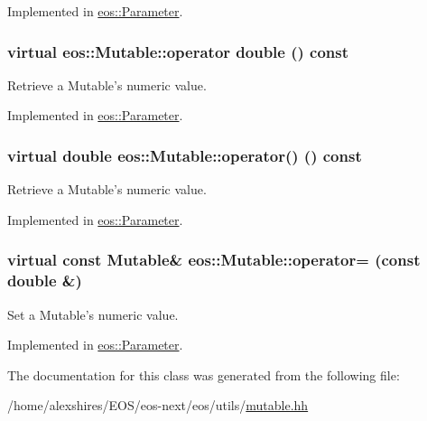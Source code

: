Implemented in \hyperlink{classeos_1_1Parameter_a86f581847722de0445ae65065940fd13}{eos::Parameter}.\hypertarget{classeos_1_1Mutable_a0763bf2933503db18d28b942aae2d324}{
\subsubsection[{operator double}]{\setlength{\rightskip}{0pt plus 5cm}virtual eos::Mutable::operator double () const}}
\label{classeos_1_1Mutable_a0763bf2933503db18d28b942aae2d324}


Retrieve a Mutable's numeric value. 

Implemented in \hyperlink{classeos_1_1Parameter_ad2dc69fe74e308328dc8a1d901c916ec}{eos::Parameter}.\hypertarget{classeos_1_1Mutable_a6efd15ab0164a1735813669506e331d7}{
\subsubsection[{operator()}]{\setlength{\rightskip}{0pt plus 5cm}virtual double eos::Mutable::operator() () const}}
\label{classeos_1_1Mutable_a6efd15ab0164a1735813669506e331d7}


Retrieve a Mutable's numeric value. 

Implemented in \hyperlink{classeos_1_1Parameter_ada58e0206d67777a79bdd2bc0c806600}{eos::Parameter}.\hypertarget{classeos_1_1Mutable_abf079592435ecb22f242b7b01c279c72}{
\subsubsection[{operator=}]{\setlength{\rightskip}{0pt plus 5cm}virtual const {\bf Mutable}\& eos::Mutable::operator= (const double \&)}}
\label{classeos_1_1Mutable_abf079592435ecb22f242b7b01c279c72}


Set a Mutable's numeric value. 

Implemented in \hyperlink{classeos_1_1Parameter_aff29f9acdc90019e76239f6c81b4014a}{eos::Parameter}.

The documentation for this class was generated from the following file:\begin{DoxyCompactItemize}
\item 
/home/alexshires/EOS/eos-\/next/eos/utils/\hyperlink{mutable_8hh}{mutable.hh}\end{DoxyCompactItemize}
